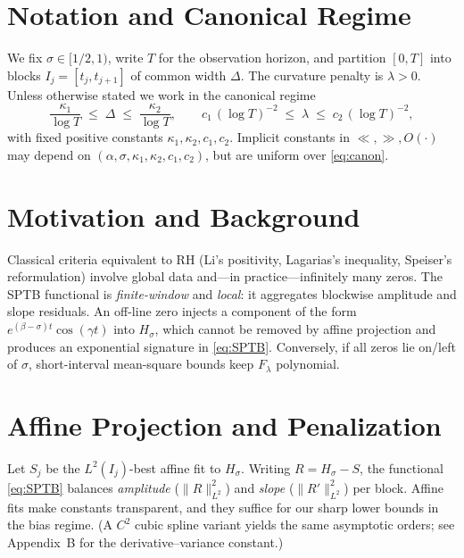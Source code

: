 \section{Notation and Canonical Regime}

We fix $\sigma\in[1/2,1)$, write $T$ for the observation horizon, and partition $[0,T]$
into blocks $I_j=[t_j,t_{j+1}]$ of common width $\Delta$.  The curvature penalty is
$\lambda>0$.  Unless otherwise stated we work in the canonical regime
\begin{equation}
\frac{\kappa_1}{\log T}\;\le\;\Delta\;\le\;\frac{\kappa_2}{\log T},
\qquad
c_1\,(\log T)^{-2}\;\le\;\lambda\;\le\;c_2\,(\log T)^{-2},
\label{eq:canon}
\tag{1.2}
\end{equation}
with fixed positive constants $\kappa_1,\kappa_2,c_1,c_2$.
Implicit constants in $\ll,\gg,O(\cdot)$ may depend on $(\alpha,\sigma,\kappa_1,\kappa_2,c_1,c_2)$,
but are uniform over \eqref{eq:canon}.

\section{Motivation and Background}

Classical criteria equivalent to RH (Li’s positivity, Lagarias’s inequality, Speiser’s
reformulation) involve global data and—in practice—infinitely many zeros.  The SPTB functional
is \emph{finite-window} and \emph{local}: it aggregates blockwise amplitude and slope residuals.
An off-line zero injects a component of the form $e^{(\beta-\sigma)t}\cos(\gamma t)$ into
$H_\sigma$, which cannot be removed by affine projection and produces an exponential signature
in \eqref{eq:SPTB}.  Conversely, if all zeros lie on/left of $\sigma$, short-interval
mean-square bounds keep $F_\lambda$ polynomial.

\section{Affine Projection and Penalization}

Let $S_j$ be the $L^2(I_j)$-best affine fit to $H_\sigma$.
Writing $R=H_\sigma-S$, the functional \eqref{eq:SPTB} balances
\emph{amplitude} ($\|R\|_{L^2}^2$) and \emph{slope} ($\|R'\|_{L^2}^2$) per block.
Affine fits make constants transparent, and they suffice for our sharp lower bounds
in the bias regime.  (A $C^2$ cubic spline variant yields the same asymptotic orders; see
Appendix~B for the derivative–variance constant.)

